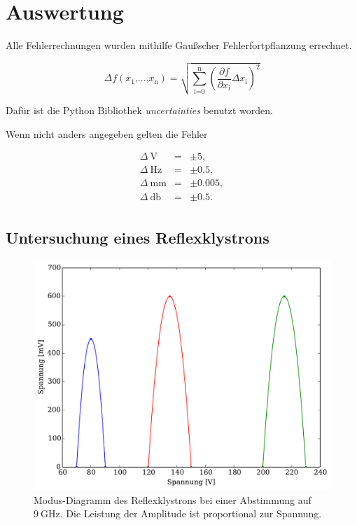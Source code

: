 \section{Auswertung} %
\label{sec:auswertung}

Alle Fehlerrechnungen wurden mithilfe Gaußscher Fehlerfortpflanzung errechnet.

\begin{equation}
	\Delta f(x_\text{1}\text{,...,}x_\text{n}) = \sqrt{\sum_\text{i=0}^\text{n} \left(\frac{\partial f}{\partial x_\text{i}} \Delta x_\text{i}\right)^2}
\end{equation}

Dafür ist die Python Bibliothek \textit{uncertainties} benutzt worden.

Wenn nicht anders angegeben gelten die Fehler

\begin{eqnarray}
	\Delta \SI{}{\volt} &=& \pm 5 ,\\
	\Delta \SI{}{\hertz} &=& \pm 0.5 ,\\
	\Delta \SI{}{\milli\meter} &=& \pm 0.005 ,\\
	\Delta \SI{}{\decibel} &=& \pm 0.5 .\\
\end{eqnarray}

\subsection{Untersuchung eines Reflexklystrons} %
\label{sub:untersuchung_der_}

\begin{figure}
	\includegraphics[width = 14cm]{pic/ModenDiagramm.pdf}
	\caption[]{Modus-Diagramm des Reflexklystrons bei einer Abstimmung auf $\SI{9}{\giga\hertz}$. Die Leistung der Amplitude ist proportional zur Spannung.}
	\label{mode}
\end{figure}


